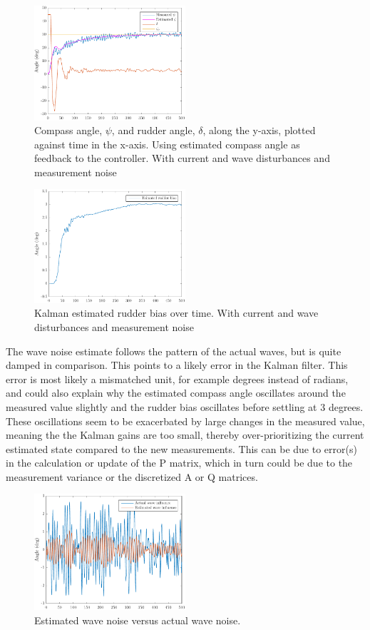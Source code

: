 \begin{figure}[htp]
    \centering
    \includegraphics[width=0.5\textwidth]{images/5e-psi_and_rudder}
    \caption{Compass angle, $\psi$, and rudder angle, $\delta$, along the y-axis, plotted against time in the x-axis. Using estimated compass angle as feedback to the controller. With current and wave disturbances and measurement noise}
    \label{fig:5e-psi_and_rudder}
\end{figure}

\begin{figure}[htp]
    \centering
    \includegraphics[width=0.5\textwidth]{images/5e-estimated_rudder_bias}
    \caption{Kalman estimated rudder bias over time. With current and wave disturbances and measurement noise}
    \label{fig:5e-estimated_rudder_bias}
\end{figure}

The wave noise estimate follows the pattern of the actual waves, but is quite damped in comparison.  This points to a likely error in the Kalman filter. This error is most likely a mismatched unit, for example degrees instead of radians, and could also explain why the estimated compass angle oscillates around the measured value slightly and the rudder bias oscillates before settling at 3 degrees.  These oscillations seem to be exacerbated by large changes in the measured value, meaning the the Kalman gains are too small, thereby over-prioritizing the current estimated state compared to the new measurements. This can be due to error(s) in the calculation or update of the P matrix, which in turn could be due to the measurement variance or the discretized A or Q matrices.

\begin{figure}[htp]
    \centering
    \includegraphics[width=0.5\textwidth]{images/5e-wave_influence}
    \caption{Estimated wave noise versus actual wave noise.}
    \label{fig:5e-wave_influence}
\end{figure}